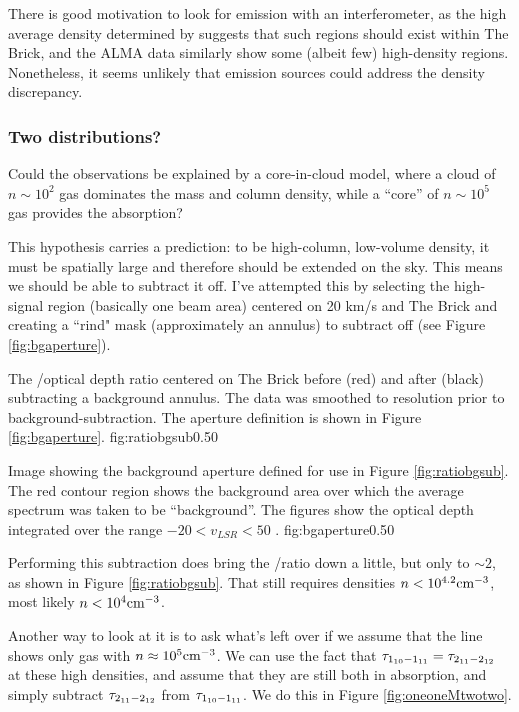 There is good motivation to look for \formaldehyde emission with an
interferometer, as the high average density determined by \citet{Longmore2012b}
suggests that such regions should exist within The Brick, and the ALMA data
similarly show some (albeit few) high-density regions.  Nonetheless, it seems
unlikely that emission sources could address the density discrepancy.

\subsubsection{Two distributions?}
Could the \formaldehyde observations be explained by a core-in-cloud model,
where a cloud of $n\sim10^2$ \percc gas dominates the mass and column density,
while a ``core'' of $n\sim10^5$ \percc gas provides the \twotwo absorption?

This hypothesis carries a prediction: to be high-column, low-volume density,
it must be spatially large and therefore should be extended on the sky. This
means we should be able to subtract it off.  I've attempted this by selecting
the high-signal region (basically one beam area) centered on 20 km/s and The Brick
and creating a ``rind" mask (approximately an annulus) to subtract off (see Figure \ref{fig:bgaperture}).

{The \formaldehyde \oneone/\twotwo optical depth ratio centered on The Brick
before (red) and after (black) subtracting a background annulus.  The
\twotwo data was smoothed to \oneone resolution prior to background-subtraction.
The aperture definition is shown in Figure \ref{fig:bgaperture}.}
{fig:ratiobgsub}{0.5}{0}

{Image showing the background aperture defined for use in Figure \ref{fig:ratiobgsub}.  The red contour region
shows the background area over which the average spectrum was taken to be ``background''.  
The \formaldehyde figures show the optical depth integrated over the range $-20 < v_{LSR} < 50$ \kms.}
{fig:bgaperture}{0.5}{0}

Performing this subtraction does bring the \oneone/\twotwo ratio down a little,
but only to $\sim2$, as shown in Figure \ref{fig:ratiobgsub}.  That still
requires densities $n<10^{4.2} \textrm{cm}^{-3}$, most likely $n<10^4 \textrm{cm}^{-3}$.

Another way to look at it is to ask what's left over if we assume that the \twotwo line shows
only gas with $n\approx10^5\textrm{cm}^{-3}$.  We can use the fact that $\tau_{1_{10}-1_{11}} = \tau_{2_{11}-2_{12}}$ 
at these high densities, and assume that they are still both in absorption, and simply subtract
$\tau_{2_{11}-2_{12}}$ from $\tau_{1_{10}-1_{11}}$.  We do this in Figure \ref{fig:oneoneMtwotwo}.

